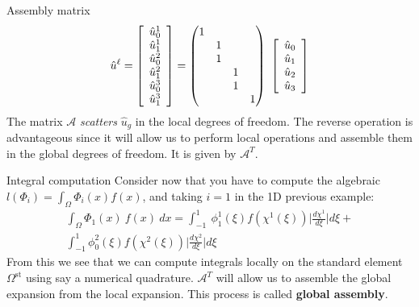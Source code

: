 \begin{frame}{Assembly matrix}
  \begin{equation}
    \label{eq:52}
    \hat{u}^\ell = \left[
      \begin{array}[c]{c}
        \hat{u}^1_0\\
        \hat{u}^1_1\\
        \hat{u}^2_0\\
        \hat{u}^2_1\\
        \hat{u}^3_0\\
        \hat{u}^3_1\\
      \end{array} \right]
    =
    \begin{pmatrix}
      1 & & &\\
      & 1 & &\\
      & 1 & &\\
      &  & 1 &\\
      &  & 1 &\\
      &  &  & 1 \\
    \end{pmatrix}
    \
    \left[\begin{array}[c]{c}
        \hat{u}_0\\
        \hat{u}_1\\
        \hat{u}_2\\
        \hat{u}_3\\
      \end{array} \right]
  \end{equation}
  The matrix $\mathcal{A}$ \emph{scatters} $\hat{u}_g$ in the local
  degrees of freedom. The reverse operation is advantageous since it
  will allow us to perform local operations and assemble them in the
  global degrees of freedom. It is given by $\mathcal{A}^T$.
\end{frame}

\begin{frame}{Integral computation}
  Consider now that you have to compute the algebraic $l(\Phi_i) =
  \int_\Omega  \Phi_i(x) f(x)$, and taking $i=1$ in the 1D previous example:
  \begin{multline}
    \label{eq:53}
    \int_\Omega \Phi_1(x)\ f(x)\ dx  = \int_{-1}^1\ \phi^1_1(\xi) f(\chi^1(\xi)) \Big|\frac{d \chi^1}{d \xi}\Big| d\xi + \\
    \int_{-1}^1 \phi^2_0(\xi) f(\chi^2(\xi)) \Big|\frac{d \chi^2}{d \xi}\Big| d\xi
  \end{multline}
  From this we see that we can compute integrals locally on the
  standard element $\Omega^{\text{st}}$ using say a numerical
  quadrature. $\mathcal{A}^T$ will allow us to assemble the global
  expansion from the local expansion. This process is called
  \textbf{global assembly}.
\end{frame}

